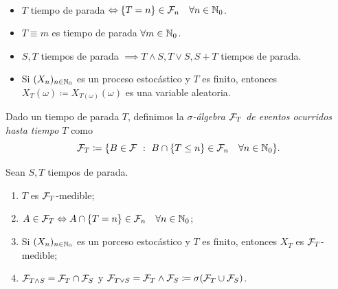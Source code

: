 \begin{property}~
	\begin{itemize}
		\item $T$ tiempo de parada $\Leftrightarrow \{T = n\} \in \mathcal{F}_{n} \quad \forall n \in \mathbb{N}_{0}$.

		\item $T \equiv m$ es tiempo de parada $\forall m \in \mathbb{N}_{0}$.

		\item $S,T$ tiempos de parada $\implies T \wedge S, T \vee S, S + T$ tiempos de parada.

		\item Si $(X_{n})_{n \in \mathbb{N}_{0}}$ es un proceso estocástico y $T$ es finito, entonces $X_{T}(\omega) \coloneq X_{T(\omega)}(\omega)$ es una variable aleatoria.
	\end{itemize}
\end{property}

\begin{definition}
	Dado un tiempo de parada $T$, definimos la \textit{$\sigma$-álgebra $\mathcal{F}_{T}$ de eventos ocurridos hasta tiempo $T$} como
	\[ \mathcal{F}_{T} \coloneq \{B \in \mathcal{F} \ : \ B \cap \{T \leq n\} \in \mathcal{F}_{n} \quad \forall n \in \mathbb{N}_{0}\}. \]
\end{definition}

\begin{property}
	Sean $S,T$ tiempos de parada.
	\begin{enumerate}
		\item $T$ es $\mathcal{F}_{T}$-medible;

		\item $A \in \mathcal{F}_{T} \Leftrightarrow A \cap \{T = n\} \in \mathcal{F}_{n} \quad \forall n \in \mathbb{N}_{0}$; 

		\item Si $(X_{n})_{n \in \mathbb{N}_{0}}$ es un porceso estocástico y $T$ es finito, entonces $X_{T}$ es $\mathcal{F}_{T}$-medible;

		\item $\mathcal{F}_{T \wedge S} = \mathcal{F}_{T} \cap \mathcal{F}_{S}$ y $\mathcal{F}_{T \vee S} = \mathcal{F}_{T} \wedge \mathcal{F}_{S} \coloneq \sigma(\mathcal{F}_{T} \cup \mathcal{F}_{S})$.
	\end{enumerate}
\end{property}

